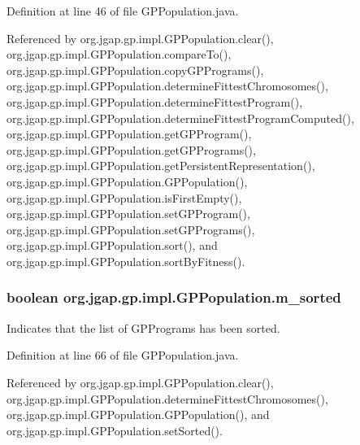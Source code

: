 Definition at line 46 of file G\-P\-Population.\-java.



Referenced by org.\-jgap.\-gp.\-impl.\-G\-P\-Population.\-clear(), org.\-jgap.\-gp.\-impl.\-G\-P\-Population.\-compare\-To(), org.\-jgap.\-gp.\-impl.\-G\-P\-Population.\-copy\-G\-P\-Programs(), org.\-jgap.\-gp.\-impl.\-G\-P\-Population.\-determine\-Fittest\-Chromosomes(), org.\-jgap.\-gp.\-impl.\-G\-P\-Population.\-determine\-Fittest\-Program(), org.\-jgap.\-gp.\-impl.\-G\-P\-Population.\-determine\-Fittest\-Program\-Computed(), org.\-jgap.\-gp.\-impl.\-G\-P\-Population.\-get\-G\-P\-Program(), org.\-jgap.\-gp.\-impl.\-G\-P\-Population.\-get\-G\-P\-Programs(), org.\-jgap.\-gp.\-impl.\-G\-P\-Population.\-get\-Persistent\-Representation(), org.\-jgap.\-gp.\-impl.\-G\-P\-Population.\-G\-P\-Population(), org.\-jgap.\-gp.\-impl.\-G\-P\-Population.\-is\-First\-Empty(), org.\-jgap.\-gp.\-impl.\-G\-P\-Population.\-set\-G\-P\-Program(), org.\-jgap.\-gp.\-impl.\-G\-P\-Population.\-set\-G\-P\-Programs(), org.\-jgap.\-gp.\-impl.\-G\-P\-Population.\-sort(), and org.\-jgap.\-gp.\-impl.\-G\-P\-Population.\-sort\-By\-Fitness().

\hypertarget{classorg_1_1jgap_1_1gp_1_1impl_1_1_g_p_population_a522f220885c90a850191b89116bee75f}{
\subsubsection[{m\-\_\-sorted}]{\setlength{\rightskip}{0pt plus 5cm}boolean org.\-jgap.\-gp.\-impl.\-G\-P\-Population.\-m\-\_\-sorted\hspace{0.3cm}{\ttfamily [private]}}}\label{classorg_1_1jgap_1_1gp_1_1impl_1_1_g_p_population_a522f220885c90a850191b89116bee75f}
Indicates that the list of G\-P\-Programs has been sorted. 

Definition at line 66 of file G\-P\-Population.\-java.



Referenced by org.\-jgap.\-gp.\-impl.\-G\-P\-Population.\-clear(), org.\-jgap.\-gp.\-impl.\-G\-P\-Population.\-determine\-Fittest\-Chromosomes(), org.\-jgap.\-gp.\-impl.\-G\-P\-Population.\-G\-P\-Population(), and org.\-jgap.\-gp.\-impl.\-G\-P\-Population.\-set\-Sorted().

